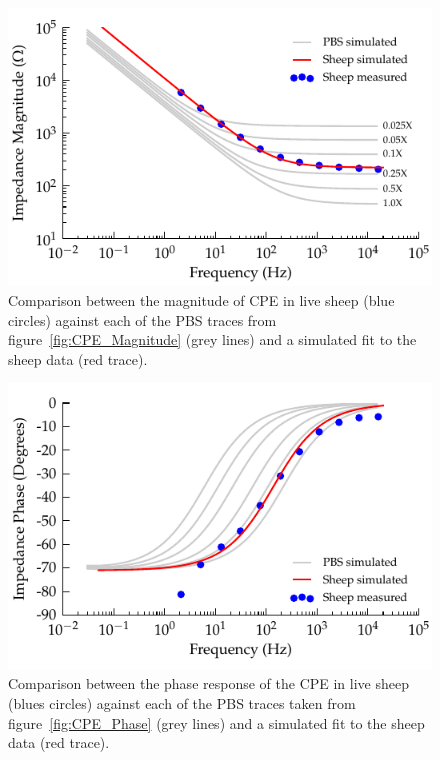\documentclass[journal, a4paper]{IEEEtran}
\begin{document}
\begin{figure}
    \begin{center}
        \includegraphics{graphics/displacement-withSheep_impedanceVsFrequency_magnitude}
    \end{center}
    \caption{Comparison between the magnitude of CPE in live sheep (blue circles) against each of the PBS traces from figure~\ref{fig:CPE_Magnitude} (grey lines) and a simulated fit to the sheep data (red trace).}
    \label{fig:displacement_sheepCPEMagnitude}
\end{figure}

\begin{figure}
    \begin{center}
        \includegraphics{graphics/displacement-withSheep_impedanceVsFrequency_phase}
    \end{center}
    \caption{Comparison between the phase response of the CPE in live sheep (blues circles) against each of the PBS traces taken from figure~\ref{fig:CPE_Phase} (grey lines) and a simulated fit to the sheep data (red trace).}
    \label{fig:displacement_sheepCPEPhase}
\end{figure}
\end{document}
